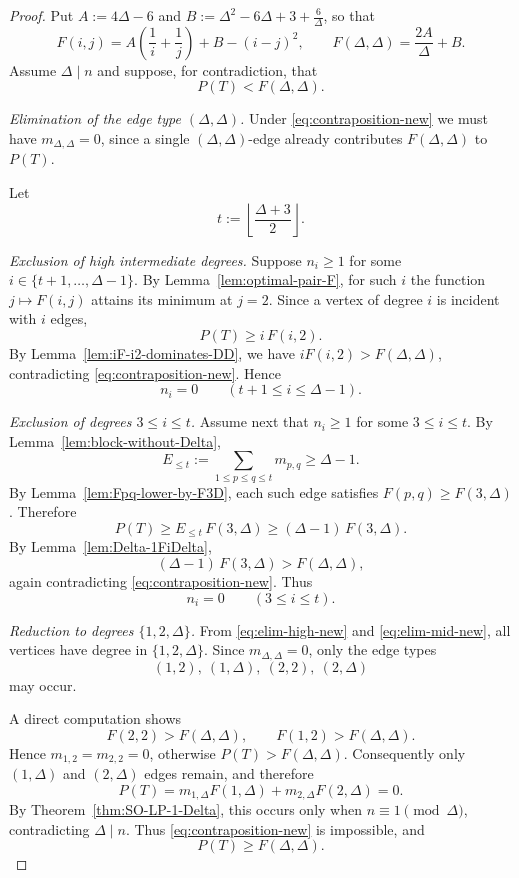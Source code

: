 \documentclass[preprint,12pt]{elsarticle}
\begin{document}
\begin{proof}
Put $A:=4\Delta-6$ and $B:=\Delta^2-6\Delta+3+\frac{6}{\Delta}$, so that
\[
F(i,j)=A\left(\frac1i+\frac1j\right)+B-(i-j)^2,
\qquad
F(\Delta,\Delta)=\frac{2A}{\Delta}+B.
\]
Assume $\Delta\mid n$ and suppose, for contradiction, that
\begin{equation}
\label{eq:contraposition-new}
P(T)<F(\Delta,\Delta).
\end{equation}

\medskip
\noindent\emph{Elimination of the edge type $(\Delta,\Delta)$.}
Under \eqref{eq:contraposition-new} we must have
$m_{\Delta,\Delta}=0$, since a single $(\Delta,\Delta)$-edge already contributes
$F(\Delta,\Delta)$ to $P(T)$.

Let
\[
t:=\left\lfloor\frac{\Delta+3}{2}\right\rfloor.
\]

\medskip
\noindent\emph{Exclusion of high intermediate degrees.}
Suppose $n_i\ge 1$ for some $i\in\{t+1,\dots,\Delta-1\}$.
By Lemma~\ref{lem:optimal-pair-F}, for such $i$ the function $j\mapsto F(i,j)$
attains its minimum at $j=2$.
Since a vertex of degree $i$ is incident with $i$ edges,
\[
P(T)\ge i\,F(i,2).
\]
By Lemma~\ref{lem:iF-i2-dominates-DD}, we have
$iF(i,2)>F(\Delta,\Delta)$, contradicting
\eqref{eq:contraposition-new}.
Hence
\begin{equation}
\label{eq:elim-high-new}
n_i=0\qquad (t+1\le i\le \Delta-1).
\end{equation}

\medskip
\noindent\emph{Exclusion of degrees $3\le i\le t$.}
Assume next that $n_i\ge 1$ for some $3\le i\le t$.
By Lemma~\ref{lem:block-without-Delta},
\[
E_{\le t}:=\sum_{1\le p\le q\le t} m_{p,q}\ge \Delta-1.
\]
By Lemma~\ref{lem:Fpq-lower-by-F3D}, each such edge satisfies
$F(p,q)\ge F(3,\Delta)$.
Therefore
\[
P(T)\ge E_{\le t}\,F(3,\Delta)\ge (\Delta-1)\,F(3,\Delta).
\]
By Lemma~\ref{lem:Delta-1FiDelta},
\[
(\Delta-1)\,F(3,\Delta)>F(\Delta,\Delta),
\]
again contradicting \eqref{eq:contraposition-new}.
Thus
\begin{equation}
\label{eq:elim-mid-new}
n_i=0\qquad (3\le i\le t).
\end{equation}

\medskip
\noindent\emph{Reduction to degrees $\{1,2,\Delta\}$.}
From \eqref{eq:elim-high-new} and \eqref{eq:elim-mid-new}, all vertices have degree
in $\{1,2,\Delta\}$.
Since $m_{\Delta,\Delta}=0$, only the edge types
\[
(1,2),\ (1,\Delta),\ (2,2),\ (2,\Delta)
\]
may occur.

A direct computation shows
\[
F(2,2)>F(\Delta,\Delta),
\qquad
F(1,2)>F(\Delta,\Delta).
\]
Hence $m_{1,2}=m_{2,2}=0$, otherwise $P(T)>F(\Delta,\Delta)$.
Consequently only $(1,\Delta)$ and $(2,\Delta)$ edges remain, and therefore
\[
P(T)=m_{1,\Delta}F(1,\Delta)+m_{2,\Delta}F(2,\Delta)=0.
\]
By Theorem~\ref{thm:SO-LP-1-Delta}, this occurs only when
$n\equiv 1\pmod{\Delta}$, contradicting $\Delta\mid n$.
Thus \eqref{eq:contraposition-new} is impossible, and
\[
P(T)\ge F(\Delta,\Delta).
\]


\end{proof}
\end{document}

